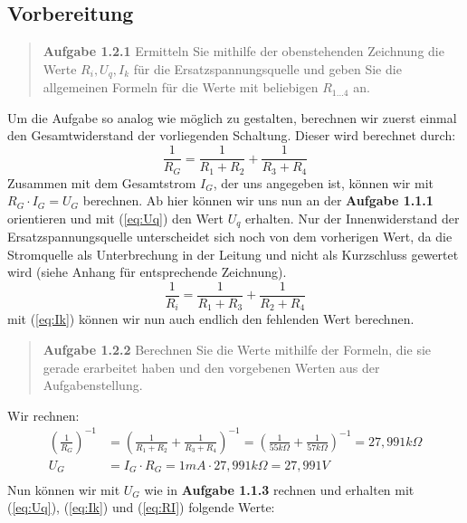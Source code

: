 \documentclass{scrarticle}
\begin{document}
\subsection{Vorbereitung}
\begin{abstract}
  \textbf{Aufgabe 1.2.1} Ermitteln Sie mithilfe der obenstehenden Zeichnung die Werte $R_i, U_q, I_k$ für die Ersatzspannungsquelle
  und geben Sie die allgemeinen Formeln für die Werte mit beliebigen $R_{1...4}$ an.
\end{abstract}
Um die Aufgabe so analog wie möglich zu gestalten, berechnen wir zuerst einmal den Gesamtwiderstand der vorliegenden Schaltung. Dieser wird berechnet durch:
\begin{equation}\label{eq:RG}
  \frac{1}{R_G} = \frac{1}{R_1 + R_2} + \frac{1}{R_3 + R_4}
\end{equation}
Zusammen mit dem Gesamtstrom $I_G$, der uns angegeben ist, können wir mit $R_G \cdot I_G = U_G$ berechnen. Ab hier können wir uns nun an der
\textbf{Aufgabe 1.1.1} orientieren und mit (\ref{eq:Uq}) den Wert $U_q$ erhalten. Nur der Innenwiderstand der Ersatzspannungsquelle unterscheidet sich noch
von dem vorherigen Wert, da die Stromquelle als Unterbrechung in der Leitung und nicht als Kurzschluss gewertet wird (siehe Anhang für entsprechende Zeichnung).
\begin{equation}
  \label{eq:RI}
  \frac{1}{R_i} = \frac{1}{R_1 + R_3} + \frac{1}{R_2 + R_4}
\end{equation}
mit (\ref{eq:Ik}) können wir nun auch endlich den fehlenden Wert berechnen.
\begin{abstract}
  \textbf{Aufgabe 1.2.2} Berechnen Sie die Werte mithilfe der Formeln, die sie gerade erarbeitet haben und den vorgebenen Werten aus der Aufgabenstellung.
\end{abstract}
Wir rechnen:
\begin{equation*}
  \begin{aligned}
    \left(\frac{1}{R_G}\right)^{-1} &= \left(\frac{1}{R_1 + R_2} + \frac{1}{R_3 + R_4}\right)^{-1} = \left(\frac{1}{55k\Omega} + \frac{1}{57k\Omega}\right)^{-1} = 27,991k\Omega\\
    U_G &= I_G \cdot R_G = 1mA \cdot 27,991k\Omega = 27,991V\\
  \end{aligned}
\end{equation*}
Nun können wir mit $U_G$ wie in \textbf{Aufgabe 1.1.3} rechnen und erhalten mit (\ref{eq:Uq}), (\ref{eq:Ik}) und (\ref{eq:RI}) folgende Werte:
\end{document}

